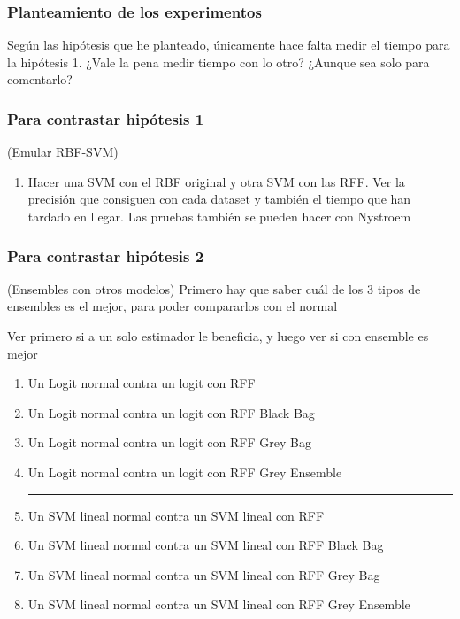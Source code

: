 \begin{note}
  \subsubsection{Planteamiento de los experimentos}

  Según las hipótesis que he planteado, únicamente hace falta medir el tiempo
  para la hipótesis 1. ¿Vale la pena medir tiempo con lo otro? ¿Aunque sea
  solo para comentarlo?

  \subsubsection*{Para contrastar hipótesis 1}
  (Emular RBF-SVM)
  \begin{enumerate}
    \item Hacer una SVM con el RBF original y otra SVM con las RFF. Ver la
    precisión que consiguen con cada dataset y también el tiempo que han
    tardado en llegar. Las pruebas también se pueden hacer con Nystroem
  \end{enumerate}

  \subsubsection*{Para contrastar hipótesis 2}
  (Ensembles con otros modelos)
  Primero hay que saber cuál de los 3 tipos de ensembles es el mejor, para poder
  compararlos con el normal

  Ver primero si a un solo estimador le beneficia, y luego ver si con ensemble
  es mejor
  \begin{enumerate}
    \item Un Logit normal contra un logit con RFF
    \item Un Logit normal contra un logit con RFF Black Bag
    \item Un Logit normal contra un logit con RFF Grey Bag
    \item Un Logit normal contra un logit con RFF Grey Ensemble
    \\\hrule
    \item Un SVM lineal normal contra un SVM lineal con RFF
    \item Un SVM lineal normal contra un SVM lineal con RFF Black Bag
    \item Un SVM lineal normal contra un SVM lineal con RFF Grey Bag
    \item Un SVM lineal normal contra un SVM lineal con RFF Grey Ensemble
  \end{enumerate}

\end{note}
